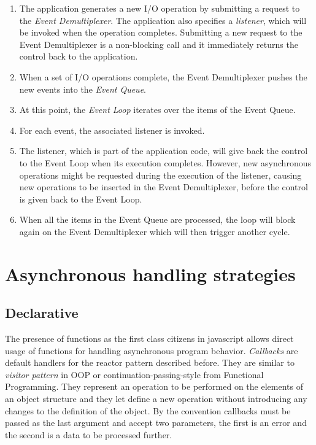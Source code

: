 \begin{enumerate}
	\item The application generates a new I/O operation by submitting a request to the \textit{Event Demultiplexer}. The application also specifies a \textit{listener}, which will be invoked when the operation completes. Submitting a new request to the Event Demultiplexer is a non-blocking call and it immediately returns the control back to the application.
	\item When a set of I/O operations complete, the Event Demultiplexer pushes the new events into the \textit{Event Queue}.
	\item At this point, the \textit{Event Loop} iterates over the items of the Event Queue.
	\item For each event, the associated listener is invoked.
	\item The listener, which is part of the application code, will give back the control to the Event Loop when its execution completes. However, new asynchronous operations might be requested during the execution of the listener, causing new operations to be inserted in the Event Demultiplexer, before the control is given back to the Event Loop.
	\item When all the items in the Event Queue are processed, the loop will block again on the Event Demultiplexer which will then trigger another cycle.
\end{enumerate}

\section{Asynchronous handling strategies}
\label{sec:asyncstrat}
\subsection{Declarative}
The presence of functions as the first class citizens in javascript allows direct usage of functions for handling asynchronous program behavior. \textit{Callbacks} are default handlers for the reactor pattern described before. They are similar to \textit{visitor pattern} in OOP or continuation-passing-style from Functional Programming. They represent an operation to be performed on the elements of an object structure and they let define a new operation without introducing any changes to the definition of the object. 
By the convention callbacks must be passed as the last argument and accept two parameters, the first is an error and the second is a data to be processed further.

